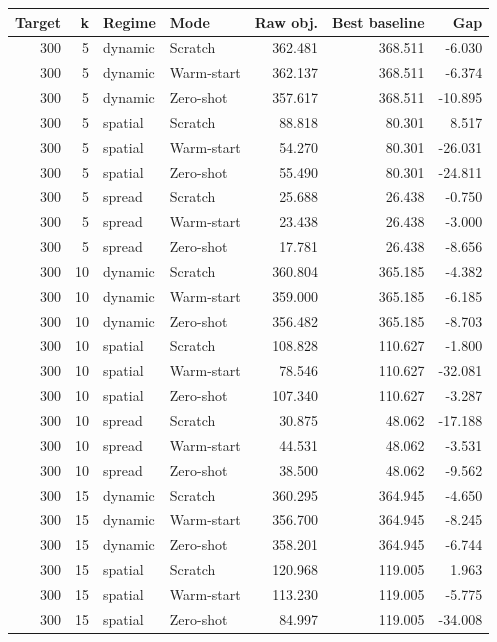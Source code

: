 \begin{tabular}{rrllrrr}
\toprule
Target & k & Regime & Mode & Raw obj. & Best baseline & Gap \\
\midrule
300 & 5 & dynamic & Scratch & 362.481 & 368.511 & -6.030 \\
300 & 5 & dynamic & Warm-start & 362.137 & 368.511 & -6.374 \\
300 & 5 & dynamic & Zero-shot & 357.617 & 368.511 & -10.895 \\
300 & 5 & spatial & Scratch & 88.818 & 80.301 & 8.517 \\
300 & 5 & spatial & Warm-start & 54.270 & 80.301 & -26.031 \\
300 & 5 & spatial & Zero-shot & 55.490 & 80.301 & -24.811 \\
300 & 5 & spread & Scratch & 25.688 & 26.438 & -0.750 \\
300 & 5 & spread & Warm-start & 23.438 & 26.438 & -3.000 \\
300 & 5 & spread & Zero-shot & 17.781 & 26.438 & -8.656 \\
300 & 10 & dynamic & Scratch & 360.804 & 365.185 & -4.382 \\
300 & 10 & dynamic & Warm-start & 359.000 & 365.185 & -6.185 \\
300 & 10 & dynamic & Zero-shot & 356.482 & 365.185 & -8.703 \\
300 & 10 & spatial & Scratch & 108.828 & 110.627 & -1.800 \\
300 & 10 & spatial & Warm-start & 78.546 & 110.627 & -32.081 \\
300 & 10 & spatial & Zero-shot & 107.340 & 110.627 & -3.287 \\
300 & 10 & spread & Scratch & 30.875 & 48.062 & -17.188 \\
300 & 10 & spread & Warm-start & 44.531 & 48.062 & -3.531 \\
300 & 10 & spread & Zero-shot & 38.500 & 48.062 & -9.562 \\
300 & 15 & dynamic & Scratch & 360.295 & 364.945 & -4.650 \\
300 & 15 & dynamic & Warm-start & 356.700 & 364.945 & -8.245 \\
300 & 15 & dynamic & Zero-shot & 358.201 & 364.945 & -6.744 \\
300 & 15 & spatial & Scratch & 120.968 & 119.005 & 1.963 \\
300 & 15 & spatial & Warm-start & 113.230 & 119.005 & -5.775 \\
300 & 15 & spatial & Zero-shot & 84.997 & 119.005 & -34.008 \\

\end{tabular}
